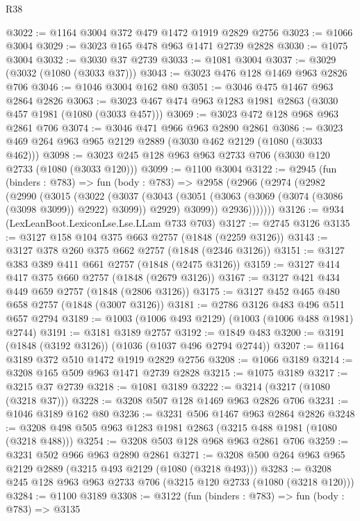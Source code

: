 \begin{lexlean}{R38}
\begin{coremodule}
@3022 := @1164 @3004 @372 @479 @1472 @1919 @2829 @2756
@3023 := @1066 @3004
@3029 := @3023 @165 @478 @963 @1471 @2739 @2828
@3030 := @1075 @3004
@3032 := @3030 @37 @2739
@3033 := @1081 @3004
@3037 := @3029 (@3032 (@1080 (@3033 @37)))
@3043 := @3023 @476 @128 @1469 @963 @2826 @706
@3046 := @1046 @3004 @162 @80
@3051 := @3046 @475 @1467 @963 @2864 @2826
@3063 := @3023 @467 @474 @963 @1283 @1981 @2863 (@3030 @457 @1981 (@1080 (@3033 @457)))
@3069 := @3023 @472 @128 @968 @963 @2861 @706
@3074 := @3046 @471 @966 @963 @2890 @2861
@3086 := @3023 @469 @264 @963 @965 @2129 @2889 (@3030 @462 @2129 (@1080 (@3033 @462)))
@3098 := @3023 @245 @128 @963 @963 @2733 @706 (@3030 @120 @2733 (@1080 (@3033 @120)))
@3099 := @1100 @3004
@3122 := @2945
    (fun (binders : @783) =>
    fun (body : @783) =>
    @2958
      (@2966
        (@2974
          (@2982
            (@2990
              (@3015
                (@3022
                  (@3037
                    (@3043
                      (@3051 (@3063 (@3069 (@3074 (@3086 (@3098 @3099)) @2922) @3099)) @2929)
                      @3099))
                  @2936)))))))
@3126 := @934 (LexLeanBoot.LexiconLse.Lse.LLam @733 @703)
@3127 := @2745 @3126
@3135 := @3127 @158 @104 @375 @663 @2757 (@1848 (@2259 @3126))
@3143 := @3127 @378 @260 @375 @662 @2757 (@1848 (@2346 @3126))
@3151 := @3127 @383 @389 @411 @661 @2757 (@1848 (@2475 @3126))
@3159 := @3127 @414 @417 @375 @660 @2757 (@1848 (@2679 @3126))
@3167 := @3127 @421 @434 @449 @659 @2757 (@1848 (@2806 @3126))
@3175 := @3127 @452 @465 @480 @658 @2757 (@1848 (@3007 @3126))
@3181 := @2786 @3126 @483 @496 @511 @657 @2794
@3189 := @1003 (@1006 @493 @2129) (@1003 (@1006 @488 @1981) @2744)
@3191 := @3181 @3189 @2757
@3192 := @1849 @483
@3200 := @3191 (@1848 (@3192 @3126)) (@1036 (@1037 @496 @2794 @2744))
@3207 := @1164 @3189 @372 @510 @1472 @1919 @2829 @2756
@3208 := @1066 @3189
@3214 := @3208 @165 @509 @963 @1471 @2739 @2828
@3215 := @1075 @3189
@3217 := @3215 @37 @2739
@3218 := @1081 @3189
@3222 := @3214 (@3217 (@1080 (@3218 @37)))
@3228 := @3208 @507 @128 @1469 @963 @2826 @706
@3231 := @1046 @3189 @162 @80
@3236 := @3231 @506 @1467 @963 @2864 @2826
@3248 := @3208 @498 @505 @963 @1283 @1981 @2863 (@3215 @488 @1981 (@1080 (@3218 @488)))
@3254 := @3208 @503 @128 @968 @963 @2861 @706
@3259 := @3231 @502 @966 @963 @2890 @2861
@3271 := @3208 @500 @264 @963 @965 @2129 @2889 (@3215 @493 @2129 (@1080 (@3218 @493)))
@3283 := @3208 @245 @128 @963 @963 @2733 @706 (@3215 @120 @2733 (@1080 (@3218 @120)))
@3284 := @1100 @3189
@3308 := @3122
    (fun (binders : @783) =>
    fun (body : @783) =>
    @3135

\end{coremodule}
\end{lexlean}
